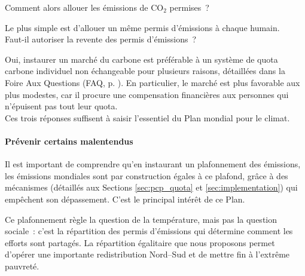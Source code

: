\documentclass[a5paper,french,openany]{memoir}
\begin{document}
Comment alors allouer les émissions de CO$_\text{2}$ permises~? 

Le plus simple %
est d'allouer un même permis d'émissions à chaque humain. \\

Faut-il autoriser la revente des permis d'émissions~? 

Oui, %
instaurer un marché du carbone est préférable à un système de quota carbone individuel non échangeable pour plusieurs raisons, détaillées dans la Foire Aux Questions (FAQ, p. \pageref{q:rationnement}). En particulier, le marché est plus favorable aux plus modestes, car il procure une compensation financières aux personnes qui n'épuisent pas tout leur quota.\\ %

Ces trois réponses suffisent à saisir l'essentiel du Plan mondial pour le climat.

\paragraph{Prévenir certains malentendus}
Il est important de comprendre qu'en instaurant un plafonnement des émissions, les émissions mondiales sont par construction égales à ce plafond, grâce à des mécanismes (détaillés aux Sections \ref{sec:pcp_quota} et \ref{sec:implementation}) qui empêchent son dépassement. C'est le principal intérêt de ce Plan.

Ce plafonnement règle la question de la température, %
mais pas la question sociale~: c'est la répartition des permis d'émissions qui détermine comment les efforts sont partagés. La répartition égalitaire que nous proposons permet d'opérer une importante redistribution Nord--Sud et de mettre fin à l'extrême pauvreté. 
\end{document}
